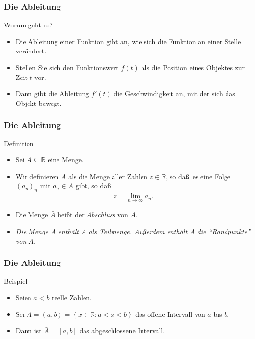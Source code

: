 \documentclass{beamer}
\title[Annuma]{\mytitle}
\author[Amin Coja-Oghlan]{Amin Coja-Oghlan}
\institute[Frankfurt]{JWGUFFM}
\date{}
\renewcommand{\emph}[1]{{\textcolor{solarizedRed}{\itshape #1}}}
\newcommand\RR{\mathbb R}
\newcommand\cbc[1]{\left\{{#1}\right\}}
\renewcommand{\ae}{\"a}
\newcommand{\mytitle}{Die Ableitung}
\begin{document}
\frame[plain]{\titlepage}

\begin{frame}\frametitle{\mytitle}
	\begin{block}{Worum geht es?}
		\begin{itemize}
			\item Die Ableitung einer Funktion gibt an, wie sich die Funktion an einer Stelle ver\ae ndert.
			\item Stellen Sie sich den Funktionswert $f(t)$ als die Position eines Objektes zur Zeit $t$ vor.
			\item Dann gibt die Ableitung $f'(t)$ die Geschwindigkeit an, mit der sich das Objekt bewegt.
		\end{itemize}
	\end{block}
\end{frame}

\begin{frame}\frametitle{\mytitle}
	\begin{block}{Definition}
		\begin{itemize}
			\item Sei $A\subseteq\RR$ eine Menge.
			\item Wir definieren $\bar A$ als die Menge aller Zahlen $z\in\RR$, so da\ss\ es eine Folge $(a_n)_n$ mit $a_n\in A$ gibt, so da\ss
				\begin{align*}
					z=\lim_{n\to\infty}a_n.
				\end{align*}
			\item Die Menge $\bar A$ hei\ss t der \emph{Abschluss} von $A$.
			\item {\itshape Die Menge $\bar A$ enth\ae lt $A$ als Teilmenge. Au\ss erdem enth\ae lt $\bar A$ die ``Randpunkte'' von $A$.}
		\end{itemize}
	\end{block}
\end{frame}

\begin{frame}\frametitle{\mytitle}
	\begin{block}{Beispiel}
		\begin{itemize}
			\item Seien $a<b$ reelle Zahlen.
			\item Sei $A=(a,b)=\cbc{x\in\RR:a<x<b}$ das offene Intervall von $a$ bis $b$.
			\item Dann ist $\bar A=[a,b]$ das abgeschlossene Intervall.
		\end{itemize}
	\end{block}
\end{frame}
\end{document}
